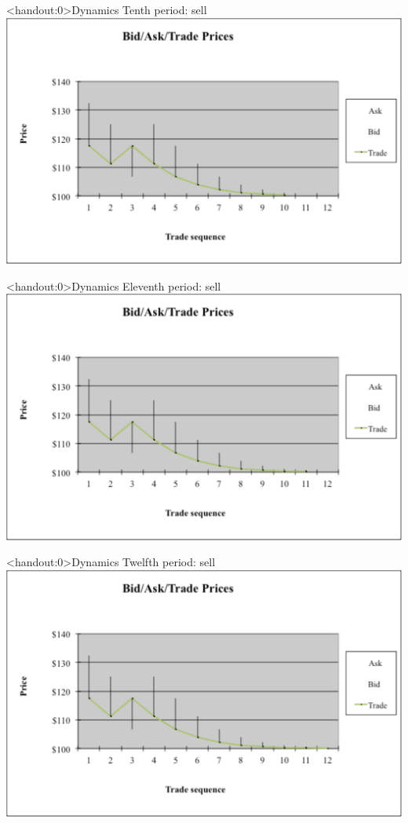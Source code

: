 \documentclass[english,10pt]{beamer}
\begin{document}
\begin{frame}<handout:0>{Dynamics}
	Tenth period: sell
	\center
	\includegraphics[width=0.9\linewidth]{pics/P10_Image.pdf}
\end{frame}


\begin{frame}<handout:0>{Dynamics}
	Eleventh period: sell
	\center
	\includegraphics[width=0.9\linewidth]{pics/P11_Image.pdf}
\end{frame}


\begin{frame}<handout:0>{Dynamics}
	Twelfth period: sell
	\center
	\includegraphics[width=0.9\linewidth]{pics/P12_Image.pdf}
\end{frame}
\end{document}
